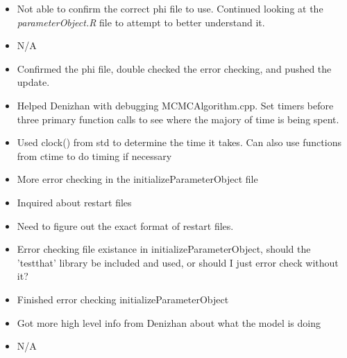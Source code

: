 \documentclass[12pt,hyperref]{labbook}
\begin{document}
\begin{itemize}
  \item Not able to confirm the correct phi file to use. Continued looking at
the \textit{parameterObject.R} file to attempt to better understand it.  
\end{itemize}
\begin{itemize}
  \item N/A
\end{itemize}

\begin{itemize}
  \item Confirmed the phi file, double checked the error checking, and pushed
the update. 
  \item Helped Denizhan with debugging MCMCAlgorithm.cpp. Set timers before
three primary function calls to see where the majory of time is being spent.  
\end{itemize}
\begin{itemize}
  \item Used clock() from std to determine the time it takes. Can also use
functions from ctime to do timing if necessary
\end{itemize}

\begin{itemize}
  \item More error checking in the initializeParameterObject file
  \item Inquired about restart files 
\end{itemize}
\begin{itemize}
  \item Need to figure out the exact format of restart files. 
  \item Error checking file existance in initializeParameterObject, should the
'testthat' library be included and used, or should I just error check without
it?
\end{itemize}

\begin{itemize}
  \item Finished error checking initializeParameterObject
  \item Got more high level info from Denizhan about what the model is doing
\end{itemize}
\begin{itemize}
  \item N/A 
\end{itemize}
\end{document}
